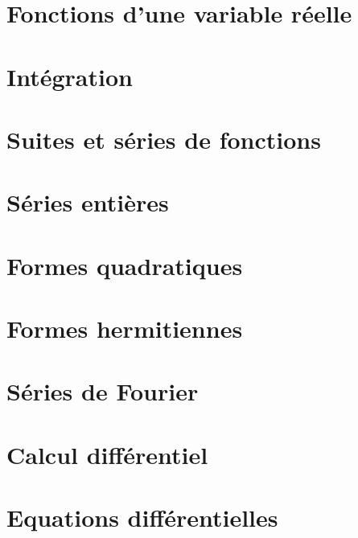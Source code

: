 \documentclass{Math}
\theoremstyle{plain}
\begin{document}
\part{Fonctions d’une variable réelle}
% 
% 
% 
% 
% 
% 
\newpage
\part{Intégration}

% 
% 
% 
% 
% 
% 
% 
% 
% 
\newpage
\part{Suites et séries de fonctions}
% 
% 

\newpage
\part{Séries entières}




\newpage
\part{Formes quadratiques}
% 
% 
% 
% 
% 
% 
\newpage
\part{Formes hermitiennes}
% 
% 
% 
% 
\newpage
\part{Séries de Fourier}

% 
% 
% 
% 
\newpage
\part{Calcul différentiel}
% 
% 
% 
% 
\newpage
\part{Equations différentielles}
% 
% 
% 
% 
% 
% 
\newpage
\end{document}
